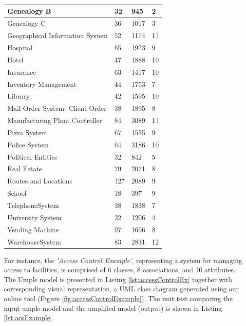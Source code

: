 \begin{table}[h]
\begin{tabularx}{\textwidth}{l|YYY}
Genealogy B & 32 & 945 & 2\\ \hline
Genealogy C & 36 & 1017 & 3\\ \hline
Geographical Information System & 52 & 1174 & 11\\ \hline
Hospital & 65 & 1923 & 9\\ \hline
Hotel & 47 & 1888 & 10\\ \hline
Insurance & 63 & 1417 & 10\\ \hline
Inventory Management & 44 & 1753 & 7\\ \hline
Library & 42 & 1595 & 10\\ \hline
Mail Order System- Client Order & 38 & 1895 & 8\\ \hline
Manufacturing Plant Controller & 84 & 3089 & 11\\ \hline
Pizza System & 67 & 1555 & 9 \\ \hline
Police System & 64 & 3186 & 10\\ \hline
Political Entities & 32 & 842 & 5\\ \hline
Real Estate & 79 & 2071 & 8\\ \hline
Routes and Locations & 127 & 2089 & 9\\ \hline
School & 18 & 397 & 9\\ \hline
TelephoneSystem & 38 & 1838 & 7\\ \hline
University System & 32 & 1206 & 4\\ \hline
Vending Machine & 97 & 1696 & 8\\ \hline
WarehouseSystem & 83 & 2831 & 12\\ \hline

\hline
\end{tabularx}
\end{table}

For instance, the \textit{'Access Control Example'}, representing a system for managing access to facilities, is comprised of 6 classes, 8 associations, and 10 attributes. The Umple model is presented in Listing \ref{lst:accessControlEx} together with corresponding visual representation, a UML class diagram generated using our online tool (Figure \ref{fig:accessControlExample}). The unit test comparing the input umple model and the umplified model (output) is shown in Listing \ref{lst:acsExample}.

